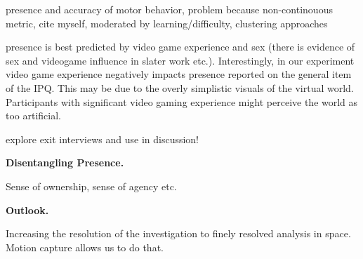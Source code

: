 presence and accuracy of motor behavior, problem because non-continouous metric, cite myself, moderated by learning/difficulty, clustering approaches

presence is best predicted by video game experience and sex (there is evidence of sex and videogame influence in slater work etc.). Interestingly, in our experiment video game experience negatively impacts presence reported on the general item of the IPQ. This may be due to the overly simplistic visuals of the virtual world. Participants with significant video gaming experience might perceive the world as too artificial.

explore exit interviews and use in discussion!

\indent \textbf{Disentangling Presence.}

Sense of ownership, sense of agency etc.

\indent \textbf{Outlook.}

Increasing the resolution of the investigation to finely resolved analysis in space. Motion capture allows us to do that.

